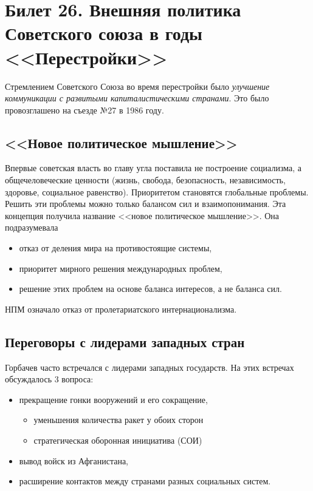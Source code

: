 \section{Билет 26. Внешняя политика Советского союза в годы <<Перестройки>>}

Стремлением Советского Союза во время перестройки было \textit{улучшение коммуникации с развитыми капиталистическими странами}. Это было провозглашено на съезде №27 в 1986 году. 

\subsection{<<Новое политическое мышление>>}
Впервые советская власть во главу угла поставила не построение социализма, а общечеловеческие ценности (жизнь, свобода, безопасность, независимость, здоровье, социальное равенство). Приоритетом становятся глобальные проблемы. Решить эти проблемы можно только балансом сил и взаимопонимания. Эта концепция получила название <<новое политическое мышление>>. Она подразумевала
\begin{itemize}
    \item отказ от деления мира на противостоящие системы,
    \item приоритет мирного решения международных проблем,
    \item решение этих проблем на основе баланса интересов, а не баланса сил.
\end{itemize} \vspace{0.5cm}

НПМ означало отказ от пролетариатского интернационализма. 

\subsection{Переговоры с лидерами западных стран}
Горбачев часто встречался с лидерами западных государств. На этих встречах обсуждалось 3 вопроса: 
\begin{itemize}
    \item прекращение гонки вооружений и его сокращение, 
        \begin{itemize}
            \item уменьшения количества ракет у обоих сторон
            \item стратегическая оборонная инициатива (СОИ)
        \end{itemize} 
    \item вывод войск из Афганистана, 
    \item расширение контактов между странами разных социальных систем.
\end{itemize} \vspace{0.5cm}

